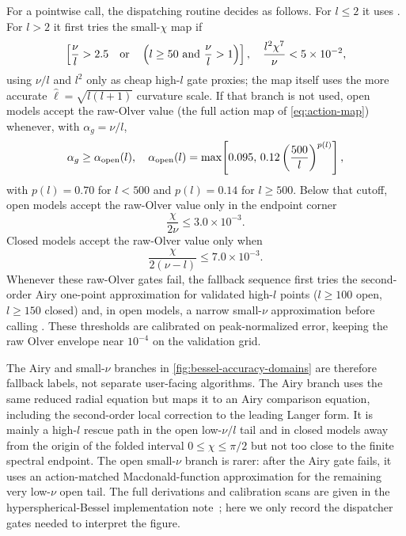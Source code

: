 \documentclass[prd, twocolumn, superscriptaddress, tightenlines, longbibliography, nofootinbib, eqsecnum, amsfonts, amsmath, floatfix, notitlepage]{revtex4-2}
\newcommand{\code}[1]{\texttt{\detokenize{#1}}}
\begin{document}
For a pointwise call, the dispatching routine \code{phi_olver} decides as
follows. For $l\le2$ it uses
\code{phi_recurs}. For $l>2$ it first tries the small-$\chi$ map if
\begin{equation}
  \left[\frac{\nu}{l}>2.5\quad{\rm or}\quad
  \left(l\ge50\ {\rm and}\ \frac{\nu}{l}>1\right)\right],
  \quad
  \frac{l^2\chi^7}{\nu}<5\times10^{-2},
\end{equation}
using $\nu/l$ and $l^2$ only as cheap high-$l$ gate proxies; the map itself uses
the more accurate $\hat\ell=\sqrt{l(l+1)}$ curvature scale. If that branch is not
used, open models accept the raw-Olver value (the full action map of
\cref{eq:action-map}) whenever, with
\(\alpha_g=\nu/l\),
\begin{equation}
  \alpha_g\ge\alpha_{\rm open}(l),\quad
  \alpha_{\rm open}(l)=\max\!\left[
  0.095,\,
  0.12\left(\frac{500}{l}\right)^{p(l)}
  \right],
  \label{eq:open-alpha-gate}
\end{equation}
with $p(l)=0.70$ for $l<500$ and $p(l)=0.14$ for $l\ge500$. Below that cutoff,
open models accept the raw-Olver value only in the endpoint corner
\begin{equation}
  \frac{\chi}{2\nu}\le3.0\times10^{-3}.
\label{eq:open-endpoint-gate}
\end{equation}
Closed models accept the raw-Olver value only when
\begin{equation}
  \frac{\chi}{2(\nu-l)}\le7.0\times10^{-3}.
\label{eq:closed-endpoint-gate}
\end{equation}
Whenever these raw-Olver gates fail, the fallback sequence first
tries the second-order Airy one-point approximation for validated high-$l$ points
($l\ge100$ open, $l\ge150$ closed) and, in open models, a narrow small-$\nu$
approximation before calling \code{phi_recurs}. These thresholds are calibrated
on peak-normalized error, keeping the raw Olver envelope near $10^{-4}$ on the
validation grid.

The Airy and small-$\nu$ branches in \cref{fig:bessel-accuracy-domains} are
therefore fallback labels, not separate user-facing algorithms. The Airy branch
uses the same reduced radial equation but maps it to an Airy comparison equation,
including the second-order local correction to the leading Langer form. It is
mainly a high-$l$ rescue path in the open low-\(\nu/l\) tail and in closed models
away from the origin of the folded interval $0\le\chi\le\pi/2$ but not too
close to the finite spectral endpoint.
The open small-$\nu$ branch is rarer: after the Airy gate fails, it uses an
action-matched Macdonald-function approximation for the remaining very low-\(\nu\)
open tail. The full derivations and calibration scans are given in the
hyperspherical-Bessel implementation note~\cite{cambhypersphericalbessel}; here
we only record the dispatcher gates needed to interpret the figure.
\end{document}

